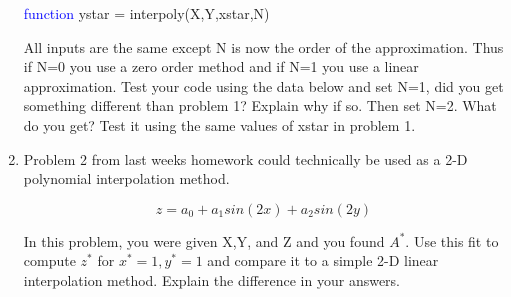 \begin{enumerate}
  \begin{framed}
    \textcolor{blue}{function} ystar = interpoly(X,Y,xstar,N)
  \end{framed}

  All inputs are the same except N is now the order of the
  approximation. Thus if N=0 you use a zero order method and if N=1
  you use a linear approximation. Test your code using the data
  below and set N=1, did you get something different than problem 1?
  Explain why if so. Then set N=2. What do you get? Test it using the
  same values of xstar in problem 1.

\item Problem 2 from last weeks homework could technically be used as
  a 2-D polynomial interpolation method. 

  \begin{equation}\nonumber
    z = a_0 + a_1sin(2x) + a_2sin(2y)
  \end{equation}

  In this problem, you were given X,Y, and Z and you found $A^*$. Use
  this fit to compute $z^*$ for $x^*=1,y^*=1$ and compare it to a
  simple 2-D linear interpolation method. Explain the difference in
  your answers. 

\end{enumerate}

